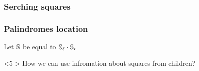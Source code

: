 \documentclass{beamer}
\begin{document}
\begin{frame}
\begin{center}
\end{center}

\end{frame}

\begin{frame}
\frametitle{Serching squares}

\begin{center}
    \squaresAlgorithm
\end{center}

\end{frame}

\begin{frame}
\frametitle{Palindromes location}

Let $\mathbb{S}$ be equal to $\mathbb{S}_\ell \cdot \mathbb{S}_r$

\palindromesLocation

\begin{alertblock}{}<5->
How we can use infromation about squares from children?
\end{alertblock}

\end{frame}
\end{document}
